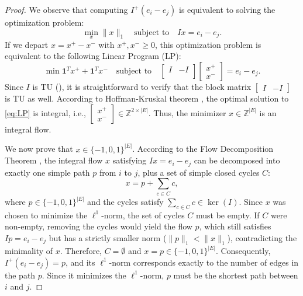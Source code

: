 \documentclass{article}
\begin{document}
\begin{proof}
We observe that computing $I^+(e_i-e_j)$ is equivalent to solving the optimization problem:
\[
\min_x \|x\|_1 \quad \text{subject to} \quad I x = e_i-e_j.
\]
If we depart $x = x^+ - x^-$ with $x^+, x^- \ge 0$, 
this optimization problem is equivalent to the following Linear Program (LP):
\begin{equation}\label{eq:LP}
\min \mathbf{1}^T x^+ + \mathbf{1}^T x^- \quad \text{subject to} \quad 
\begin{bmatrix}
I & -I\\  
\end{bmatrix}
\begin{bmatrix}
x^+ \\ x^- 
\end{bmatrix} = 
e_i-e_j.
\end{equation}
Since $I$ is TU (\cite{schrijver1986theory}),
it is straightforward to verify that the block matrix 
$\begin{bmatrix}
    I & -I
\end{bmatrix}$ is TU as well.
According to Hoffman-Kruskal theorem \cite[Corollary 19.2a]{schrijver1986theory},
the optimal solution to \cref{eq:LP} is integral,
i.e.,
$
\begin{bmatrix} x^+ \\ x^- 
\end{bmatrix} 
\in \mathbb{Z}^{2\times|E|}.
$
Thus,
the minimizer $x\in \mathbb{Z}^{|E|}$ is an integral flow.

We now prove that $x\in \{-1, 0, 1\}^{|E|}$.
According to the Flow Decomposition Theorem \cite[Theorem 3.5]{MR1205775}, the integral flow $x$ satisfying $Ix = e_i - e_j$ can be decomposed into exactly one simple path $p$ from $i$ to $j$, 
plus a set of simple closed cycles $C$:
\[
x = p + \sum_{c \in C} c,
\]
where $p\in \{-1, 0, 1\}^{|E|}$ and the cycles satisfy $\sum\limits_{c\in C} c\in \ker (I)$.
Since $x$ was chosen to minimize the $\ell^1$-norm,
the set of cycles $C$ must be empty. 
If $C$ were non-empty,
removing the cycles would yield the flow $p$,
which still satisfies $Ip = e_i - e_j$ but has a strictly smaller norm ($\|p\|_1 < \|x\|_1$), 
contradicting the minimality of $x$. 
Therefore, $C = \emptyset$ and $x = p \in \{-1, 0, 1\}^{|E|}$. 
Consequently,
$I^+(e_i-e_j)=p$,
and its $\ell^1$-norm corresponds exactly to the number of edges in the path $p$. Since it minimizes the $\ell^1$-norm, $p$ must be the shortest path between $i$ and $j$.
\end{proof}
\end{document}

